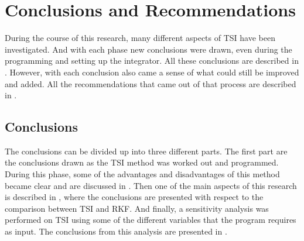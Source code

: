 \chapter{Conclusions and Recommendations} 
\label{ch:conclusionsandrecommendations}
During the course of this research, many different aspects of \ac{TSI} have been investigated. And with each phase new conclusions were drawn, even during the programming and setting up the integrator. All these conclusions are described in . However, with each conclusion also came a sense of what could still be improved and added. All the recommendations that came out of that process are described in .


\section{Conclusions}
\label{sec:conclusions}
The conclusions can be divided up into three different parts. The first part are the conclusions drawn as the \ac{TSI} method was worked out and programmed. During this phase, some of the advantages and disadvantages of this method became clear and are discussed in . Then one of the main aspects of this research is described in , where the conclusions are presented with respect to the comparison between \ac{TSI} and \ac{RKF}. And finally, a sensitivity analysis was performed on \ac{TSI} using some of the different variables that the program requires as input. The conclusions from this analysis are presented in .

